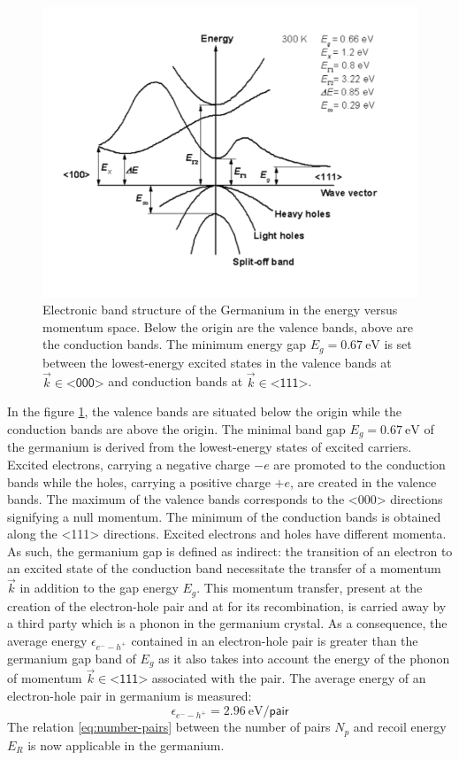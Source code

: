 \begin{figure}
\centering
\includegraphics[scale=0.66]{Figures/Electrodes/germanium_conduction_bands.pdf}
\caption{Electronic band structure of the Germanium in the energy versus momentum space. Below the origin are the valence bands, above are the conduction bands. The minimum energy gap $E_g = \SI{0.67}{\eV}$ is set between the lowest-energy excited states in the valence bands at $\vec{k} \in \textsf{<000>}$ and conduction bands at $\vec{k} \in \textsf{<111>}$.}
\label{fig:ge-band-structure}
\end{figure}

In the figure \ref{fig:ge-band-structure}, the valence bands are situated below the origin while the conduction bands are above the origin. The minimal band gap $E_g = \SI{0.67}{\eV}$ of the germanium is derived from the lowest-energy states of excited carriers. Excited electrons, carrying a negative charge $-e$ are promoted to the conduction bands while the holes, carrying a positive charge $+e$, are created in the valence bands. The maximum of the valence bands corresponds to the <000> directions signifying a null momentum. The minimum of the conduction bands is obtained along the <111> directions. Excited electrons and holes have different momenta. As such, the germanium gap is defined as indirect: the transition of an electron to an excited state of the conduction band necessitate the transfer of a momentum $\vec{k}$ in addition to the gap energy $E_g$. This momentum transfer, present at the creation of the electron-hole pair and at for its recombination, is carried away by a third party which is a phonon in the germanium crystal. As a consequence, the average energy $\epsilon_{e^--h^+}$ contained in an electron-hole pair is greater than the germanium gap band of $E_g$ as it also takes into account the energy of the phonon of momentum $\vec{k} \in \textsf{<111>}$ associated with the pair. The average energy of an electron-hole pair in germanium is measured:
\begin{equation}
\label{eq:energy-pair}
\epsilon_{e^--h^+} = \SI{2.96}{\eV \per \textsf{pair}}
\end{equation} 
The relation \ref{eq:number-pairs} between the number of pairs $N_p$ and recoil energy $E_R$ is now applicable in the germanium.

